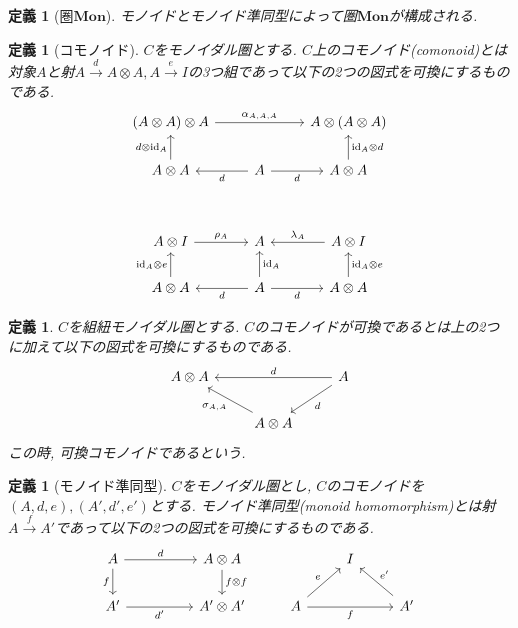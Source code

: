 \documentclass[a4paper,12pt]{ltjsarticle}
\theoremstyle{break}
\newtheorem{defn}[thm]{定義}
\newcommand{\mon}{\mathbf{Mon}}
\newcommand{\xr}[1]{\xrightarrow{#1}}
\newcommand{\id}{\mathrm{id}}
\newcommand{\al}{\alpha}
\newcommand{\la}{\lambda}
\newcommand{\si}{\sigma}
\newcommand{\ot}{\otimes}
\numberwithin{equation}{section}
\begin{document}
\begin{defn}[圏$\mon$]
  モノイドとモノイド準同型によって圏$\mon$が構成される. 
\end{defn}

\begin{defn}[コモノイド]
  $C$をモノイダル圏とする. 
  $C$上のコモノイド(comonoid)とは対象$A$と射$A \xr{d} A \ot A, A \xr{e} I$の3つ組であって以下の2つの図式を可換にするものである. 
  \[\begin{tikzcd}
    {(A \ot A) \ot A} && {A \ot (A \ot A)} \\
    {A \ot A} & A & {A \ot A} \\
    \\
    {A \ot I} & A & {A \ot I} \\
    {A \ot A} & A & {A \ot A}
    \arrow["{\id_A \ot d}"', from=2-3, to=1-3]
    \arrow["{\al_{A,A,A}}", from=1-1, to=1-3]
    \arrow["{d \ot \id_A}", from=2-1, to=1-1]
    \arrow["d"', from=2-2, to=2-3]
    \arrow["d", from=2-2, to=2-1]
    \arrow["{\id_A}"', from=5-2, to=4-2]
    \arrow["{\la_A}"', from=4-3, to=4-2]
    \arrow["{\id_A \ot e}"', from=5-3, to=4-3]
    \arrow["d"', from=5-2, to=5-3]
    \arrow["{\rho_A}", from=4-1, to=4-2]
    \arrow["{\id_A \ot e}", from=5-1, to=4-1]
    \arrow["d", from=5-2, to=5-1]
  \end{tikzcd}\]
\end{defn}

\begin{defn}
  $C$を組紐モノイダル圏とする. 
  $C$のコモノイドが可換であるとは上の2つに加えて以下の図式を可換にするものである.
  \[\begin{tikzcd}
    {A \ot A} && A \\
    & {A \ot A}
    \arrow["d"', from=1-3, to=1-1]
    \arrow["{\si_{A,A}}", from=2-2, to=1-1]
    \arrow["d", from=1-3, to=2-2]
  \end{tikzcd}\]
  この時, 可換コモノイドであるという. 
\end{defn}

\begin{defn}[モノイド準同型]
  $C$をモノイダル圏とし, $C$のコモノイドを$(A,d,e), (A',d',e')$とする. 
  モノイド準同型(monoid homomorphism)とは射$A \xr{f} A'$であって以下の2つの図式を可換にするものである. 
  \[\begin{tikzcd}
    A && {A \ot A} && I \\
    {A'} && {A' \ot A'} & A && {A'}
    \arrow["d", from=1-1, to=1-3]
    \arrow["{f \ot f}", from=1-3, to=2-3]
    \arrow["f"', from=1-1, to=2-1]
    \arrow["{d'}"', from=2-1, to=2-3]
    \arrow["e", from=2-4, to=1-5]
    \arrow["f"', from=2-4, to=2-6]
    \arrow["{e'}"', from=2-6, to=1-5]
  \end{tikzcd}\]
\end{defn}
\end{document}
